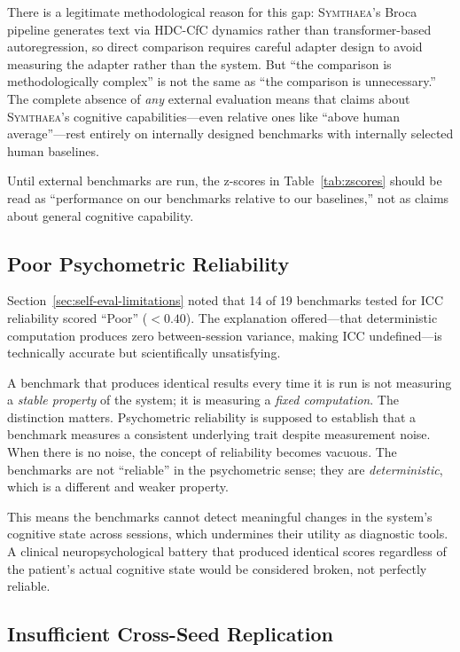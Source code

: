 \documentclass[12pt]{book}
\newcommand{\symthaea}{\textsc{Symthaea}}
\begin{document}
There is a legitimate methodological reason for this gap: \symthaea{}'s Broca pipeline generates text via HDC-CfC dynamics rather than transformer-based autoregression, so direct comparison requires careful adapter design to avoid measuring the adapter rather than the system. But ``the comparison is methodologically complex'' is not the same as ``the comparison is unnecessary.'' The complete absence of \textit{any} external evaluation means that claims about \symthaea{}'s cognitive capabilities---even relative ones like ``above human average''---rest entirely on internally designed benchmarks with internally selected human baselines.

Until external benchmarks are run, the z-scores in Table~\ref{tab:zscores} should be read as ``performance on our benchmarks relative to our baselines,'' not as claims about general cognitive capability.

\subsection{Poor Psychometric Reliability}

Section~\ref{sec:self-eval-limitations} noted that 14 of 19 benchmarks tested for ICC reliability scored ``Poor'' ($< 0.40$). The explanation offered---that deterministic computation produces zero between-session variance, making ICC undefined---is technically accurate but scientifically unsatisfying.

A benchmark that produces identical results every time it is run is not measuring a \textit{stable property} of the system; it is measuring a \textit{fixed computation}. The distinction matters. Psychometric reliability is supposed to establish that a benchmark measures a consistent underlying trait despite measurement noise. When there is no noise, the concept of reliability becomes vacuous. The benchmarks are not ``reliable'' in the psychometric sense; they are \textit{deterministic}, which is a different and weaker property.

This means the benchmarks cannot detect meaningful changes in the system's cognitive state across sessions, which undermines their utility as diagnostic tools. A clinical neuropsychological battery that produced identical scores regardless of the patient's actual cognitive state would be considered broken, not perfectly reliable.

\subsection{Insufficient Cross-Seed Replication}
\end{document}
